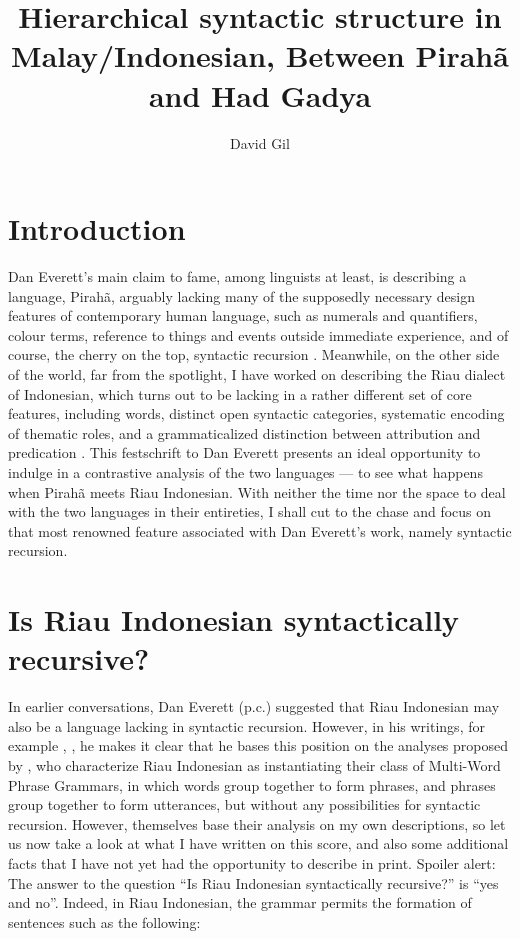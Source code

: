 \documentclass[output=paper,colorlinks,citecolor=brown
]{langscibook}
\author{David Gil\affiliation{Max Planck Institute for Evolutionary Anthropology}}
\title[Hierarchical syntactic structure in Malay/Indonesian]{Hierarchical syntactic structure in Malay/Indonesian,
Between Pirahã and Had Gadya}
\begin{document}
\maketitle

\section{Introduction}
\begin{sloppypar}
Dan Everett's main claim to fame, among linguists at least, is describing a language, Pirahã, arguably lacking many of the supposedly necessary design features of contemporary human language, such as numerals and quantifiers, colour terms, reference to things and events outside immediate experience, and of course, the cherry on the top, syntactic recursion \citep{everett2005cultural}. Meanwhile, on the other side of the world, far from the spotlight, I have worked on describing the Riau dialect of Indonesian, which turns out to be lacking in a rather different set of core features, including words, distinct open syntactic categories, systematic encoding of thematic roles, and a grammaticalized distinction between attribution and predication \citep{gil2005word,gil2006intonation,gil2012predication,gil2013riau, gil2017isolating, gil2020isolating}. This festschrift to Dan Everett presents an ideal opportunity to indulge in a contrastive analysis of the two languages — to see what happens when Pirahã meets Riau Indonesian. With neither the time nor the space to deal with the two languages in their entireties, I shall cut to the chase and focus on that most renowned feature associated with Dan Everett's work, namely syntactic recursion.
\end{sloppypar}

\section{Is Riau Indonesian syntactically recursive?}

In earlier conversations, Dan Everett (p.c.) suggested that Riau Indonesian may also be a language lacking in syntactic recursion. However, in his writings, for example \citet{futrell2016corpus}, \citet{everett2017grammar}, he makes it clear that he bases this position on the analyses proposed by \citet{jackendoff2014syntax, jackendoff2017linear}, who characterize Riau Indonesian as instantiating their class of Multi-Word Phrase Grammars, in which words group together to form phrases, and phrases group together to form utterances, but without any possibilities for syntactic recursion. However, \citet{jackendoff2014syntax, jackendoff2017linear} themselves base their analysis on my own descriptions, so let us now take a look at what I have written on this score, and also some additional facts that I have not yet had the opportunity to describe in print. Spoiler alert: The answer to the question ``Is Riau Indonesian syntactically recursive?'' is ``yes and no''.
Indeed, in Riau Indonesian, the grammar permits the formation of sentences such as the following:
\end{document}

